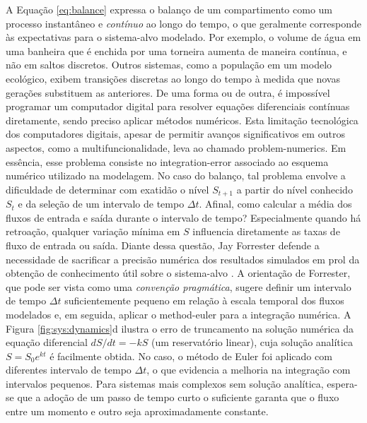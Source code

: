 \documentclass[./main.tex]{subfiles}
\begin{document}
\par A Equação \eqref{eq:balance} expressa o balanço de um compartimento como um processo instantâneo e \textit{contínuo} ao longo do tempo, o que geralmente corresponde às expectativas para o sistema-alvo modelado. Por exemplo, o volume de água em uma banheira que é enchida por uma torneira aumenta de maneira contínua, e não em saltos discretos. Outros sistemas, como a população em um modelo ecológico, exibem transições discretas ao longo do tempo à medida que novas gerações substituem as anteriores. De uma forma ou de outra, é impossível programar um computador digital para resolver equações diferenciais contínuas diretamente, sendo preciso aplicar métodos numéricos. Esta limitação tecnológica dos computadores digitais, apesar de permitir avanços significativos em outros aspectos, como a multifuncionalidade, leva ao chamado \gls{problem-numerics}. Em essência, esse problema consiste no \gls{integration-error} associado ao esquema numérico utilizado na modelagem. No caso do balanço, tal problema envolve a dificuldade de determinar com exatidão o nível $S_{t+1}$ a partir do nível conhecido $S_t$ e da seleção de um intervalo de tempo $\Delta t$. Afinal, como calcular a média dos fluxos de entrada e saída durante o intervalo de tempo? Especialmente quando há retroação, qualquer variação mínima em $S$ influencia diretamente as taxas de fluxo de entrada ou saída. Diante dessa questão, Jay Forrester defende a necessidade de sacrificar a precisão numérica dos resultados simulados em prol da obtenção de conhecimento útil sobre o sistema-alvo \cite{forrester1964}. A orientação de Forrester, que pode ser vista como uma \textit{convenção pragmática}, sugere definir um intervalo de tempo $\Delta t$ suficientemente pequeno em relação à escala temporal dos fluxos modelados e, em seguida, aplicar o \gls{method-euler} para a integração numérica. A Figura \ref{fig:sys:dynamics}d ilustra o erro de truncamento na solução numérica da equação diferencial $dS/dt = -kS$ (um reservatório linear), cuja solução analítica $S = S_0e^{kt}$ é facilmente obtida. No caso, o método de Euler foi aplicado com diferentes intervalo de tempo $\Delta t$, o que evidencia a melhoria na integração com intervalos pequenos. Para sistemas mais complexos sem solução analítica, espera-se que a adoção de um passo de tempo curto o suficiente garanta que o fluxo entre um momento e outro seja aproximadamente constante. 
\end{document}

